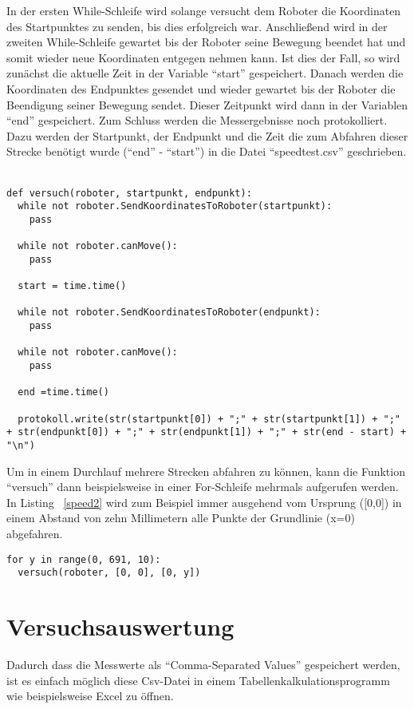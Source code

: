 In der ersten While-Schleife wird solange versucht dem Roboter die Koordinaten des Startpunktes zu senden, bis dies erfolgreich war. Anschließend wird in der zweiten While-Schleife gewartet bis der Roboter seine Bewegung beendet hat und somit wieder neue Koordinaten entgegen nehmen kann. Ist dies der Fall, so wird zunächst die aktuelle Zeit in der Variable \enquote{start} gespeichert. Danach werden die Koordinaten des Endpunktes gesendet und wieder gewartet bis der Roboter die Beendigung seiner Bewegung sendet. Dieser Zeitpunkt wird dann in der Variablen \enquote{end} gespeichert. Zum Schluss werden die Messergebnisse noch protokolliert. Dazu werden der Startpunkt, der Endpunkt und die Zeit die zum Abfahren dieser Strecke benötigt wurde (\enquote{end} - \enquote{start}) in die Datei \enquote{speedtest.csv} geschrieben.  
\\
\\
\begin{lstlisting}[caption= Python-Funktion für die Zeitmessung, label=speed1]
def versuch(roboter, startpunkt, endpunkt):
  while not roboter.SendKoordinatesToRoboter(startpunkt):
    pass

  while not roboter.canMove():
    pass
    
  start = time.time()
    
  while not roboter.SendKoordinatesToRoboter(endpunkt):
    pass  
     
  while not roboter.canMove():
    pass
    
  end =time.time()  

  protokoll.write(str(startpunkt[0]) + ";" + str(startpunkt[1]) + ";" + str(endpunkt[0]) + ";" + str(endpunkt[1]) + ";" + str(end - start) + "\n")
\end{lstlisting}

Um in einem Durchlauf mehrere Strecken abfahren zu können, kann die Funktion \enquote{versuch} dann beispielsweise in einer For-Schleife mehrmals aufgerufen werden. In Listing ~\ref{speed2} wird zum Beispiel immer ausgehend vom Ursprung ([0,0]) in einem Abstand von zehn Millimetern alle Punkte der Grundlinie (x=0) abgefahren.    
\\
\begin{lstlisting}[caption=Abfahren der Grundlinie, label=speed2]
for y in range(0, 691, 10):
  versuch(roboter, [0, 0], [0, y])
\end{lstlisting} 

\section{Versuchsauswertung}
Dadurch dass die Messwerte als \enquote{Comma-Separated Values} gespeichert werden, ist es einfach möglich diese Csv-Datei in einem Tabellenkalkulationsprogramm wie beispielsweise Excel zu öffnen. 

